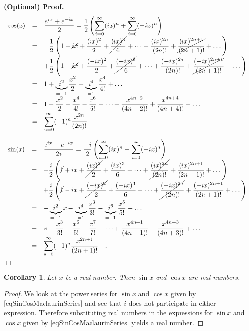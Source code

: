 \documentclass[12pt]{book}
\newenvironment{proofOptional}[1][]{ \noindent \textbf{(Optional) Proof#1.}}{$\Box$\medskip}
\newtheorem{corollary}[theorem]{Corollary}
\begin{document}
\begin{proofOptional}
\[
\begin{array}{rcl}
\displaystyle\cos(x)&=& \displaystyle \frac{e^{ix}+e^{-ix}}{2}= \frac 12 \left(\sum_{i=0}^\infty (ix)^{n}+ \sum_{i=0}^\infty (-ix)^{n}\right)\\
&=&\displaystyle  \phantom{+} \frac12\left( 1+ \cancel{ix} + \frac{(ix)^2}2 +\cancel{\frac{(ix)^3}6}+\dots + \frac{(ix)^{2n}}{(2n)!}+ \cancel{\frac{(ix)^{2n+1}}{(2n+1)!}} +\dots \right)
\\
&&\displaystyle +  \frac12\left( 1-\cancel{ix} + \frac{(-ix)^2}2 +\cancel{\frac{(-ix)^3}6}+\dots + \frac{(-ix)^{2n}}{(2n)!}+ \cancel{\frac{(-ix)^{2n+1}}{(2n+1)!}}+\dots \right)\\
&=&\displaystyle  1+\underbrace{i^2}_{=-1}\frac{x^{2}}2+\underbrace{i^4}_{=1}\frac{x^{4}}{4!}+\dots\\
&=&\displaystyle  1-\frac{x^2}{2}+ \frac{x^4}{4!}- \frac{x^6}{6!} + \dots -\frac{x^{4n+2}}{(4n+2)!}+ \frac{x^{4n+4}}{(4n+4)!}+\dots\\
&=&\displaystyle \sum_{n=0}^\infty (-1)^n\frac{x^{2n}}{(2n)!}
\end{array}
\]


\[
\begin{array}{rcl}
\displaystyle\sin(x)&=&\displaystyle  \frac{e^{ix}- e^{-ix}}{2i} = \displaystyle \frac {-i}{2} \left(\sum_{i=0}^\infty (ix)^{n}- \sum_{i=0}^\infty (-ix)^{n}\right) \\
&=&\displaystyle -\frac{i}{2}\left(\cancel{1} + ix + \cancel{\frac{(ix)^2}2} +{\frac{(ix)^3}6}+\dots + \cancel{\frac{(ix)^{2n}}{(2n)!}}+ {\frac{(ix)^{2n+1}}{(2n+1)!}} +\dots \right)\\
&&\displaystyle  +  \frac{i}{2}\left(\cancel{1} -{ix} + \cancel{\frac{(-ix)^2}2} +{\frac{(-ix)^3}6}+\dots + \cancel{\frac{(-ix)^{2n}}{(2n)!}}+ {\frac{(-ix)^{2n+1}}{(2n+1)!}}+\dots \right)\\
&=&\displaystyle  - \underbrace{i^2}_{=-1} x-\underbrace{i^4}_{=1} \frac{x^3}{3!}- \underbrace{i^{6}}_{=-1} \frac{x^5}{5!} -\dots\\
&=&\displaystyle  x-\frac{x^3}{3!}+ \frac{x^5}{5!} -\frac{x^7}{7!} +\dots +\frac{x^{4n+1}}{(4n+1)!}- \frac{x^{4n+3}}{(4n+3)!}+\dots\\
&=&\displaystyle \sum_{n=0}^{\infty}(-1)^n\frac{x^{2n+1}}{(2n+1)!}\quad .
\end{array}
\]
\end{proofOptional}
\begin{corollary}\label{corSinCosOfRealIsReal}
Let $x $ be a real number. Then $\sin x$ and $\cos x$ are real numbers.
\end{corollary}
\begin{proof}
We look at the power series for $\sin x$ and $\cos x$ given by \eqref{eqSinCosMaclaurinSeries} and see that $i$ does not participate in either expression. Therefore substituting real numbers in the expressions for $\sin x$ and $\cos x$ given by \eqref{eqSinCosMaclaurinSeries} yields a real number.
\end{proof}
\end{document}
